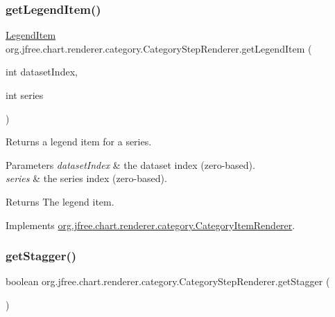 \subsubsection{\texorpdfstring{get\+Legend\+Item()}{getLegendItem()}}
{\footnotesize\ttfamily \mbox{\hyperlink{classorg_1_1jfree_1_1chart_1_1_legend_item}{Legend\+Item}} org.\+jfree.\+chart.\+renderer.\+category.\+Category\+Step\+Renderer.\+get\+Legend\+Item (\begin{DoxyParamCaption}\item[{int}]{dataset\+Index,  }\item[{int}]{series }\end{DoxyParamCaption})}

Returns a legend item for a series.


\begin{DoxyParams}{Parameters}
{\em dataset\+Index} & the dataset index (zero-\/based). \\
\hline
{\em series} & the series index (zero-\/based).\\
\hline
\end{DoxyParams}
\begin{DoxyReturn}{Returns}
The legend item. 
\end{DoxyReturn}


Implements \mbox{\hyperlink{interfaceorg_1_1jfree_1_1chart_1_1renderer_1_1category_1_1_category_item_renderer_ab9269f34c8b4859211e4f4472636c93c}{org.\+jfree.\+chart.\+renderer.\+category.\+Category\+Item\+Renderer}}.

\mbox{\label{classorg_1_1jfree_1_1chart_1_1renderer_1_1category_1_1_category_step_renderer_ae84e3b11eb3555721e6b3fc599fd5100}} 
\subsubsection{\texorpdfstring{get\+Stagger()}{getStagger()}}
{\footnotesize\ttfamily boolean org.\+jfree.\+chart.\+renderer.\+category.\+Category\+Step\+Renderer.\+get\+Stagger (\begin{DoxyParamCaption}{ }\end{DoxyParamCaption})}

